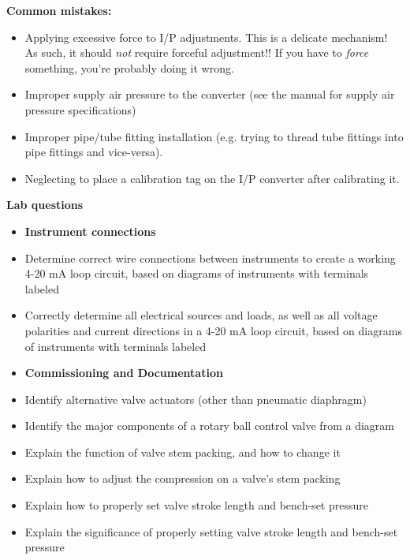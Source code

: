 \vskip 10pt

{\bf Common mistakes:}

\begin{itemize}
\item Applying excessive force to I/P adjustments.  This is a delicate mechanism!  As such, it should {\it not} require forceful adjustment!!  If you have to {\it force} something, you're probably doing it wrong.
\item Improper supply air pressure to the converter (see the manual for supply air pressure specifications)
\item Improper pipe/tube fitting installation (e.g. trying to thread tube fittings into pipe fittings and vice-versa).
\item Neglecting to place a calibration tag on the I/P converter after calibrating it.
\end{itemize}








\vskip 10pt

\vfil \eject

\noindent
{\bf Lab questions}

\begin{itemize}
\item {\bf Instrument connections}
\item Determine correct wire connections between instruments to create a working 4-20 mA loop circuit, based on diagrams of instruments with terminals labeled
\item Correctly determine all electrical sources and loads, as well as all voltage polarities and current directions in a 4-20 mA loop circuit, based on diagrams of instruments with terminals labeled
\end{itemize}

\filbreak

\begin{itemize}
\item {\bf Commissioning and Documentation}
\item Identify alternative valve actuators (other than pneumatic diaphragm)
\item Identify the major components of a rotary ball control valve from a diagram
\item Explain the function of valve stem packing, and how to change it
\item Explain how to adjust the compression on a valve's stem packing
\item Explain how to properly set valve stroke length and bench-set pressure
\item Explain the significance of properly setting valve stroke length and bench-set pressure
\end{itemize}

